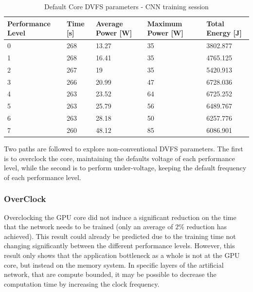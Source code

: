 \begin{table}[!htb]
\centering
\begin{tabular}{lllll}
\textbf{Performance Level} & \textbf{Time {[}s{]}} & \textbf{Average Power {[}W{]}} & \textbf{Maximum Power {[}W{]}} & \textbf{Total Energy {[}J{]}} \\ \hline
0                          & 268                   & 13.27                          & 35                             & 3802.877                      \\
1                          & 268                   & 16.41                          & 35                             & 4765.125                      \\
2                          & 267                   & 19                             & 35                             & 5420.913                      \\
3                          & 266                   & 20.99                          & 47                             & 6728.036                      \\
4                          & 263                   & 23.52                          & 64                             & 6725.252                      \\
5                          & 263                    & 25.79                          & 56                             & 6489.767                      \\
6                          & 263                   & 28.18                          & 50                             & 6257.776                      \\
7                          & 260                   & 48.12                          & 85                             & 6086.901                     
\end{tabular}
\caption{Default Core DVFS parameters - CNN training session}
\label{tab:defaultDVFStrain}
\end{table}

Two paths are followed to explore non-conventional DVFS parameters. The first is to overclock the core, maintaining the defaults voltage of each performance level, while the second is to perform under-voltage, keeping the default frequency of each performance level.

\subsubsection{OverClock}
\label{section:OverClock}
Overclocking the GPU core did not induce a significant reduction on the time that the network needs to be trained (only an average of $2\%$ reduction has achieved). This result could already be predicted due to the training time not changing significantly between the different performance levels. However, this result only shows that the application bottleneck as a whole is not at the GPU core, but instead on the memory system. In specific layers of the artificial network, that are compute bounded, it may be possible to decrease the computation time by increasing the clock frequency.

